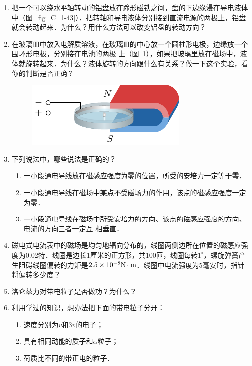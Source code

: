 \begin{enumerate}
    \item 把一个可以绕水平轴转动的铝盘放在蹄形磁铁之间，盘的下边缘浸在导电液体中（图~\ref{fig_C_1-43}）．把转轴和导电液体分别接到直流电源的两极上，铝盘就会转动起来．为什么？用什么方法可以改变铝盘的转动方向？
\item 在玻璃皿中放入电解质溶液，在玻璃皿的中心放一个圆柱形电极，边缘放一个围环形电极，分别接在电池的两极
上（图~\ref{fig_C_1-44}），如果把玻璃里放在磁场中，液体就旋转起来．为什么？液体旋转的方向跟什么有关系？做一下这个实验，看你的判断是否正确？
\begin{figure}[htbp]
    \centering
    \includegraphics{fig/C/1-44.pdf}
    \caption{}\label{fig_C_1-44}
\end{figure}
\item 下列说法中，哪些说法是正确的？
\begin{enumerate}
    \item 一小段通电导线放在磁感应强度为零的位置，所受的安培力一定等于零．
    \item 一小段通电导线在磁场中某点不受磁场力的作用，该点的磁感应强度一定为零．
    \item 一小段通电导线在磁场中所受安培力的方向、该点的磁感应强度的方向、电流的方向三者一定互
相垂直．
\end{enumerate}

\item 磁电式电流表中的磁场是均匀地辐向分布的，线圈两侧边所在位置的磁感应强度为0.02特．线圈是边长1厘米的正方形，共100匝，线圈每转$1^{\circ}$，螺旋弹簧产生阻碍线圈偏转的力矩是$2.5\times10^{-8}{\rm N}\cdot {\rm m}$．线圈中电流强度为5毫安时，指针将偏转多少度？
\item 洛仑兹力对带电粒子是否做功？为什么？    
\item 利用学过的知识，想办法把下面的带电粒子分开：
\begin{enumerate}
    \item 速度分别为$v$和$3v$的电子；
    \item 具有相同动能的质子和$\alpha$粒子；
    \item 荷质比不同的带正电的粒子．
\end{enumerate}


\end{enumerate}
